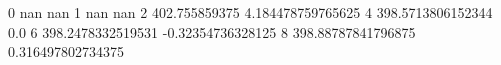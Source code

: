 0 nan nan
1 nan nan
2 402.755859375 4.184478759765625
4 398.5713806152344 0.0
6 398.2478332519531 -0.32354736328125
8 398.88787841796875 0.316497802734375
